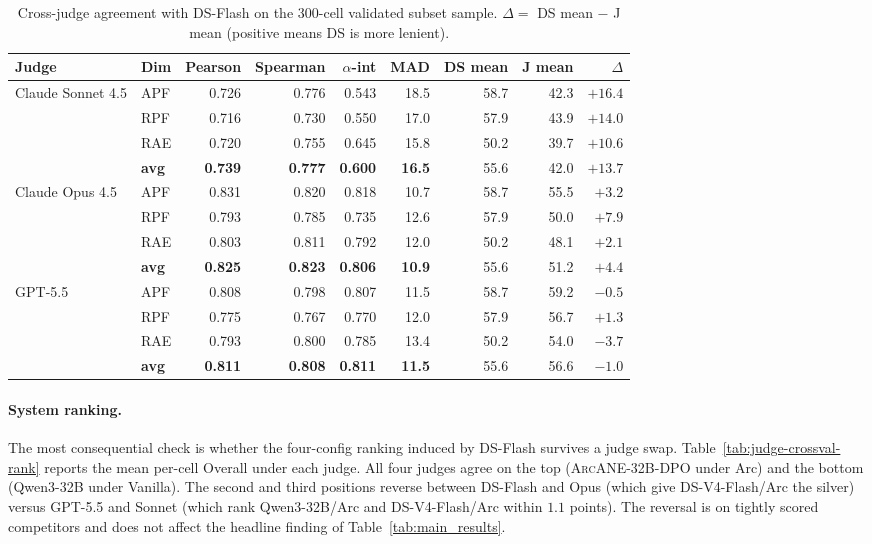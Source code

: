 \documentclass[11pt]{article}
\newcommand{\ours}{\textsc{ArcANE}}
\begin{document}
\begin{table}[t!]
\centering
\small
\setlength{\tabcolsep}{5pt}
\renewcommand{\arraystretch}{0.95}
\begin{tabular}{llrrrrrrr}
\toprule
Judge & Dim & Pearson & Spearman & $\alpha$-int & MAD & DS mean & J mean & $\Delta$ \\
\midrule
\multirow{4}{*}{Claude Sonnet 4.5} & APF & 0.726 & 0.776 & 0.543 & 18.5 & 58.7 & 42.3 & $+16.4$ \\
                                   & RPF & 0.716 & 0.730 & 0.550 & 17.0 & 57.9 & 43.9 & $+14.0$ \\
                                   & RAE & 0.720 & 0.755 & 0.645 & 15.8 & 50.2 & 39.7 & $+10.6$ \\
                                   & \textbf{avg} & \textbf{0.739} & \textbf{0.777} & \textbf{0.600} & \textbf{16.5} & 55.6 & 42.0 & $\mathbf{+13.7}$ \\
\midrule
\multirow{4}{*}{Claude Opus 4.5}   & APF & 0.831 & 0.820 & 0.818 & 10.7 & 58.7 & 55.5 & $+3.2$ \\
                                   & RPF & 0.793 & 0.785 & 0.735 & 12.6 & 57.9 & 50.0 & $+7.9$ \\
                                   & RAE & 0.803 & 0.811 & 0.792 & 12.0 & 50.2 & 48.1 & $+2.1$ \\
                                   & \textbf{avg} & \textbf{0.825} & \textbf{0.823} & \textbf{0.806} & \textbf{10.9} & 55.6 & 51.2 & $\mathbf{+4.4}$ \\
\midrule
\multirow{4}{*}{GPT-5.5}           & APF & 0.808 & 0.798 & 0.807 & 11.5 & 58.7 & 59.2 & $-0.5$ \\
                                   & RPF & 0.775 & 0.767 & 0.770 & 12.0 & 57.9 & 56.7 & $+1.3$ \\
                                   & RAE & 0.793 & 0.800 & 0.785 & 13.4 & 50.2 & 54.0 & $-3.7$ \\
                                   & \textbf{avg} & \textbf{0.811} & \textbf{0.808} & \textbf{0.811} & \textbf{11.5} & 55.6 & 56.6 & $\mathbf{-1.0}$ \\
\bottomrule
\end{tabular}
\caption{Cross-judge agreement with DS-Flash on the $300$-cell validated subset sample. $\Delta = $ DS mean $-$ J mean (positive means DS is more lenient).}
\label{tab:judge-crossval-overall}
\end{table}

\paragraph{System ranking.} The most consequential check is whether the four-config ranking induced by DS-Flash survives a judge swap. Table~\ref{tab:judge-crossval-rank} reports the mean per-cell Overall under each judge. All four judges agree on the top (\ours{}-32B-DPO under Arc) and the bottom (Qwen3-32B under Vanilla). The second and third positions reverse between DS-Flash and Opus (which give DS-V4-Flash/Arc the silver) versus GPT-5.5 and Sonnet (which rank Qwen3-32B/Arc and DS-V4-Flash/Arc within $1.1$ points). The reversal is on tightly scored competitors and does not affect the headline finding of Table~\ref{tab:main_results}.
\end{document}
